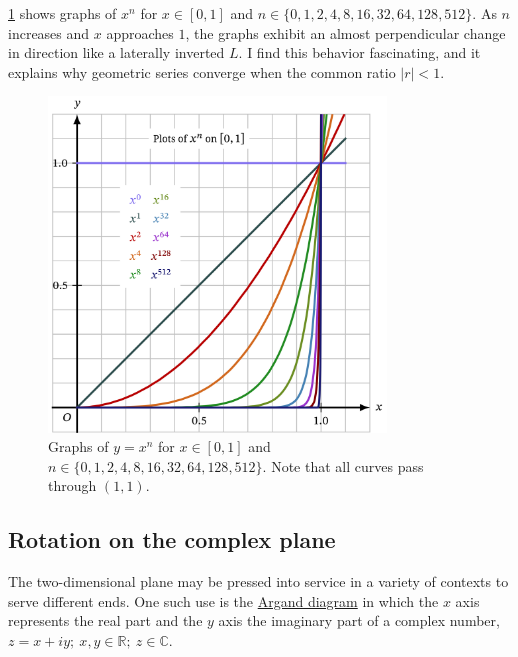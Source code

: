\documentclass[
  a4paper,
]{article}
\begin{document}
\cref{fig:x-to-n} shows graphs of \(x^n\) for \(x \in [0, 1]\) and
\(n \in\{0, 1, 2, 4, 8, 16, 32, 64, 128, 512\}\). As \(n\) increases and
\(x\) approaches \(1\), the graphs exhibit an almost perpendicular
change in direction like a laterally inverted \(L\). I find this
behavior fascinating, and it explains why geometric series converge when
the common ratio \(\lvert r \rvert < 1\).

\begin{figure}
\hypertarget{fig:x-to-n}{%
\centering
\includegraphics[width=0.8\textwidth,height=\textheight]{images/xn.png}
\caption{Graphs of \(y = x^n\) for \(x \in [0, 1]\) and
\(n \in \{0, 1, 2, 4, 8, 16, 32, 64, 128, 512\}\). Note that all curves
pass through \((1, 1)\).}\label{fig:x-to-n}
}
\end{figure}

\hypertarget{rotation-on-the-complex-plane}{%
\subsection{Rotation on the complex
plane}\label{rotation-on-the-complex-plane}}

The two-dimensional plane may be pressed into service in a variety of
contexts to serve different ends. One such use is the
\href{https://mathworld.wolfram.com/ArgandDiagram.html}{Argand diagram}
in which the \(x\) axis represents the real part and the \(y\) axis the
imaginary part of a complex number,
\(z = x + iy;\:x, y \in \mathbb{R};\: z \in \mathbb{C}\).
\end{document}
